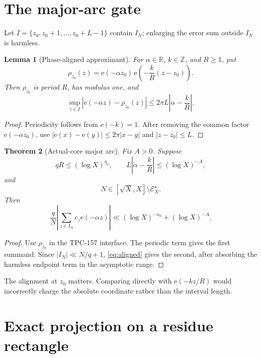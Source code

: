 \documentclass[11pt]{article}
\newtheorem{theorem}{Theorem}[section]
\newtheorem{lemma}[theorem]{Lemma}
\theoremstyle{definition}
\newcommand{\e}{\mathrm e}
\begin{document}
\section{The major-arc gate}

Let \(I=\{z_0,z_0+1,\ldots,z_0+L-1\}\) contain \(I_N\); enlarging the
error sum outside \(I_N\) is harmless.

\begin{lemma}[Phase-aligned approximant]\label{lem:aligned}
For \(\alpha\in\mathbb R\), \(k\in\mathbb Z\), and \(R\ge1\), put
\[
 \rho_{z_0}(z)=\e(-\alpha z_0)\,
               \e\!\left(-\frac{k}{R}(z-z_0)\right).
\]
Then \(\rho_{z_0}\) is period \(R\), has modulus one, and
\begin{equation}
 \sup_{z\in I}|\e(-\alpha z)-\rho_{z_0}(z)|
 \le 2\pi L\left|\alpha-\frac{k}{R}\right|.
\label{eq:aligned}
\end{equation}
\end{lemma}

\begin{proof}
Periodicity follows from \(\e(-k)=1\).  After removing the common
factor \(\e(-\alpha z_0)\), use
\(|\e(x)-\e(y)|\le2\pi|x-y|\) and
\(|z-z_0|\le L\).
\end{proof}

\begin{theorem}[Actual-core major arc]\label{thm:major}
Fix \(A>0\).  Suppose
\[
 qR\le(\log X)^{\eta_0},\qquad
 L\left|\alpha-\frac{k}{R}\right|
 \le(\log X)^{-A},
\]
and
\[
 N\in[\sqrt X,X]\setminus\mathcal E_X^\star.
\]
Then
\begin{equation}
 \boxed{\;
 \frac qN\left|
 \sum_{z\in I_N}c_z\e(-\alpha z)
 \right|
 \ll(\log X)^{-\kappa_0}+(\log X)^{-A}.\;}
\label{eq:major}
\end{equation}
\end{theorem}

\begin{proof}
Use \(\rho_{z_0}\) in the TPC-157 interface.  The periodic term gives
the first summand.  Since \(|I_N|\ll N/q+1\), \eqref{eq:aligned}
gives the second, after absorbing the harmless endpoint term in the
asymptotic range.
\end{proof}

The alignment at \(z_0\) matters.  Comparing directly with
\(\e(-kz/R)\) would incorrectly charge the absolute coordinate
rather than the interval length.

\section{Exact projection on a residue rectangle}
\end{document}
